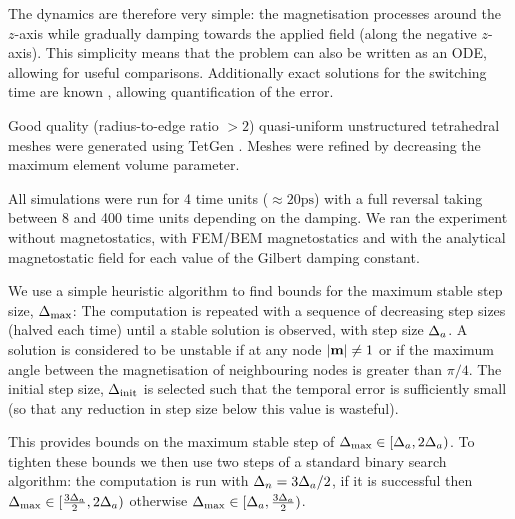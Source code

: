 The dynamics are therefore very simple: the magnetisation processes around the $z$-axis while gradually damping towards the applied field (along the negative $z$-axis).
This simplicity means that the problem can also be written as an ODE, allowing for useful comparisons.
Additionally exact solutions for the switching time are known \cite{Mallinson2000}, allowing quantification of the error.

Good quality (radius-to-edge ratio $ > 2$) quasi-uniform unstructured tetrahedral meshes were generated using TetGen \cite{tetgen-website}. Meshes were refined by decreasing the maximum element volume parameter.

All simulations were run for 4 time units ($\approx 20\text{ps}$) with a full reversal taking between 8 and 400 time units depending on the damping.
We ran the experiment without magnetostatics, with FEM/BEM magnetostatics and with the analytical magnetostatic field for each value of the Gilbert damping constant.

We use a simple heuristic algorithm to find bounds for the maximum stable step size, $\Delta_{\text{max}}$: The computation is repeated with a sequence of decreasing step sizes (halved each time) until a stable solution is observed, with step size $\Delta_{a}$. A solution is considered to be unstable if at any node $|\mathbf{m}| \neq 1$ or if the maximum angle between the magnetisation of neighbouring nodes is greater than $\pi/4$. The initial step size, $\Delta_{\text{init}}$ is selected such that the temporal error is sufficiently small (so that any reduction in step size below this value is wasteful).

This provides bounds on the maximum stable step of $\Delta_{\text{max}} \in [\Delta_{a}, 2\Delta_{a})$. To tighten these bounds we then use two steps of a standard binary search algorithm: the computation is run with $\Delta_{n}{} = 3\Delta_{a}/2$, if it is successful then $\Delta_{\text{max}} \in [\frac{3\Delta_{a}}{2}, 2\Delta_{a})$ otherwise $\Delta_{\text{max}} \in [\Delta_{a}, \frac{3\Delta_{a}}{2})$.


